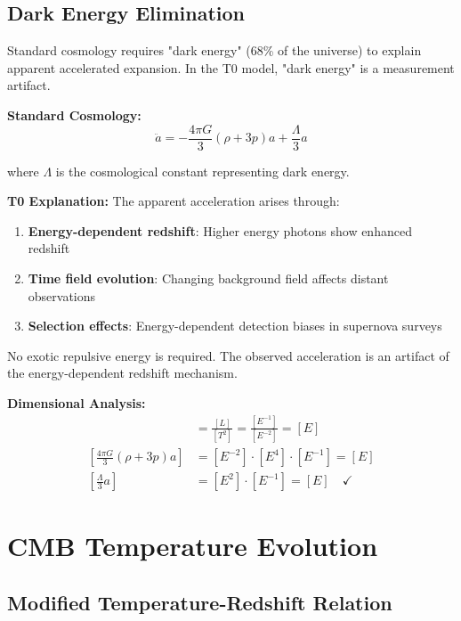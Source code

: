 \documentclass[12pt,a4paper]{report}
\begin{document}
	\subsection{Dark Energy Elimination}
	\label{subsec:dark_energy_elimination}
	
	Standard cosmology requires "dark energy" (68\% of the universe) to explain apparent accelerated expansion. In the T0 model, "dark energy" is a measurement artifact.
	
	\textbf{Standard Cosmology:}
	\begin{equation}
		\ddot{a} = -\frac{4\pi G}{3}(\rho + 3p)a + \frac{\Lambda}{3}a
	\end{equation}
	
	where $\Lambda$ is the cosmological constant representing dark energy.
	
	\textbf{T0 Explanation:}
	The apparent acceleration arises through:
	\begin{enumerate}
		\item \textbf{Energy-dependent redshift}: Higher energy photons show enhanced redshift
		\item \textbf{Time field evolution}: Changing background field affects distant observations
		\item \textbf{Selection effects}: Energy-dependent detection biases in supernova surveys
	\end{enumerate}
	
	No exotic repulsive energy is required. The observed acceleration is an artifact of the energy-dependent redshift mechanism.
	
	\textbf{Dimensional Analysis:}
	\begin{align}
		[\ddot{a}] &= \frac{[L]}{[T^2]} = \frac{[E^{-1}]}{[E^{-2}]} = [E] \\
		\left[\frac{4\pi G}{3}(\rho + 3p)a\right] &= [E^{-2}] \cdot [E^4] \cdot [E^{-1}] = [E] \\
		\left[\frac{\Lambda}{3}a\right] &= [E^2] \cdot [E^{-1}] = [E] \quad \checkmark
	\end{align}
	
	\section{CMB Temperature Evolution}
	\label{sec:cmb_temperature_evolution}
	
	\subsection{Modified Temperature-Redshift Relation}
	\label{subsec:modified_temperature_redshift}
	
\end{document}
